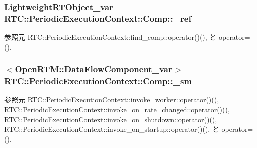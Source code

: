 \subsubsection[{\_\-ref}]{\setlength{\rightskip}{0pt plus 5cm}LightweightRTObject\_\-var {\bf RTC::PeriodicExecutionContext::Comp::\_\-ref}}\label{structRTC_1_1PeriodicExecutionContext_1_1Comp_a89c18f8979cf0aebe1d86aa3f325e87d}


参照元 RTC::PeriodicExecutionContext::find\_\-comp::operator()(), と operator=().

\subsubsection[{\_\-sm}]{$<$OpenRTM::DataFlowComponent\_\-var$>$ {\bf RTC::PeriodicExecutionContext::Comp::\_\-sm}}\label{structRTC_1_1PeriodicExecutionContext_1_1Comp_af6e5c9ecbc12788026b4211c6952bf6d}


参照元 RTC::PeriodicExecutionContext::invoke\_\-worker::operator()(), RTC::PeriodicExecutionContext::invoke\_\-on\_\-rate\_\-changed::operator()(), RTC::PeriodicExecutionContext::invoke\_\-on\_\-shutdown::operator()(), RTC::PeriodicExecutionContext::invoke\_\-on\_\-startup::operator()(), と operator=().

